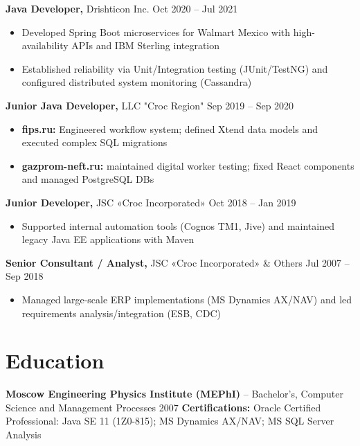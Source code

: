 \documentclass[11pt]{article}
\begin{document}
\textbf{Java Developer,} Drishticon Inc. \hfill Oct 2020 -- Jul 2021 \\
\vspace{-9pt}
\begin{itemize}
  \item Developed Spring Boot microservices for Walmart Mexico with high-availability APIs and IBM Sterling integration
  \item Established reliability via Unit/Integration testing (JUnit/TestNG) and configured distributed system monitoring (Cassandra)
\end{itemize}

\textbf{Junior Java Developer,} LLC "Croc Region" \hfill Sep 2019 -- Sep 2020 \\
\vspace{-9pt}
\begin{itemize}
  \item \textbf{fips.ru:} Engineered workflow system; defined Xtend data models and executed complex SQL migrations
  \item \textbf{gazprom-neft.ru:} maintained digital worker testing; fixed React components and managed PostgreSQL DBs
\end{itemize}

\textbf{Junior Developer,} JSC «Croc Incorporated» \hfill Oct 2018 -- Jan 2019 \\
\vspace{-9pt}
\begin{itemize}
  \item Supported internal automation tools (Cognos TM1, Jive) and maintained legacy Java EE applications with Maven
\end{itemize}

\textbf{Senior Consultant / Analyst,} JSC «Croc Incorporated» \& Others \hfill Jul 2007 -- Sep 2018 
\vspace{-9pt}
\begin{itemize}
  \item Managed large-scale ERP implementations (MS Dynamics AX/NAV) and led requirements analysis/integration (ESB, CDC)
\end{itemize}

\vspace{-6.5pt}

\section*{Education}
\textbf{Moscow Engineering Physics Institute (MEPhI)} -- Bachelor's, Computer Science and Management Processes \hfill 2007 \linebreak[2]
\textbf{Certifications:} Oracle Certified Professional: Java SE 11 (1Z0-815); MS Dynamics AX/NAV; MS SQL Server Analysis 
\end{document}
